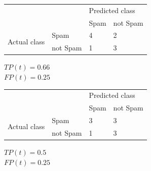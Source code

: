\documentclass[a4paper]{article}
\theoremstyle{definition}
\newenvironment{soln}{
    \leavevmode\color{blue}\ignorespaces
}{}
\begin{document}
\begin{enumerate}
\begin{enumerate}
\begin{soln}
                  \begin{center}
                     \label{tab:title}
                    \begin{tabular}{l l | l l}
                                                    &          & \multicolumn{2}{l}{Predicted class}            \\
                                                    &          & Spam                                & not Spam \\
                      \hline
                      \multirow{2}{*}{Actual class} & Spam     & 4                                   & 2        \\
                                                    & not Spam & 1                                   & 3
                    \end{tabular}
                  \end{center}
                  $TP(t) = 0.66$\\
                  $FP(t) = 0.25$

                  \begin{center}
                     \label{tab:title}
                    \begin{tabular}{l l | l l}
                                                    &          & \multicolumn{2}{l}{Predicted class}            \\
                                                    &          & Spam                                & not Spam \\
                      \hline
                      \multirow{2}{*}{Actual class} & Spam     & 3                                   & 3        \\
                                                    & not Spam & 1                                   & 3
                    \end{tabular}
                  \end{center}
                  $TP(t) = 0.5$\\
                  $FP(t) = 0.25$


\end{soln}
\end{enumerate}
\end{enumerate}
\end{document}
